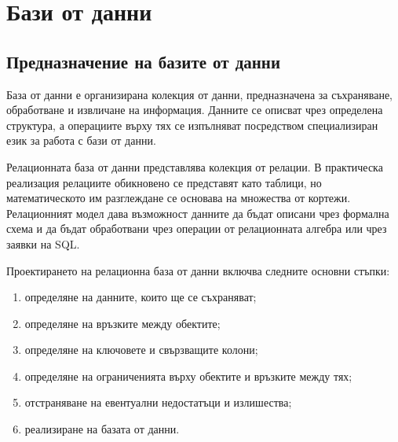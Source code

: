 \begin{konspekt}
\end{konspekt}

\section{Бази от данни}\label{s:23.1}

\subsection{Предназначение на базите от данни}\label{s:23.1.1}

\begin{defn}
База от данни е организирана колекция от данни, предназначена за съхраняване, обработване и извличане на информация. Данните се описват чрез определена структура, а операциите върху тях се изпълняват посредством специализиран език за работа с бази от данни.
\end{defn}

\begin{defn}
Релационната база от данни представлява колекция от релации. В практическа реализация релациите обикновено се представят като таблици, но математическото им разглеждане се основава на множества от кортежи. Релационният модел дава възможност данните да бъдат описани чрез формална схема и да бъдат обработвани чрез операции от релационната алгебра или чрез заявки на SQL.
\end{defn}

Проектирането на релационна база от данни включва следните основни стъпки:

\begin{enumerate}
    \item определяне на данните, които ще се съхраняват;
    \item определяне на връзките между обектите;
    \item определяне на ключовете и свързващите колони;
    \item определяне на ограниченията върху обектите и връзките между тях;
    \item отстраняване на евентуални недостатъци и излишества;
    \item реализиране на базата от данни.
\end{enumerate}

